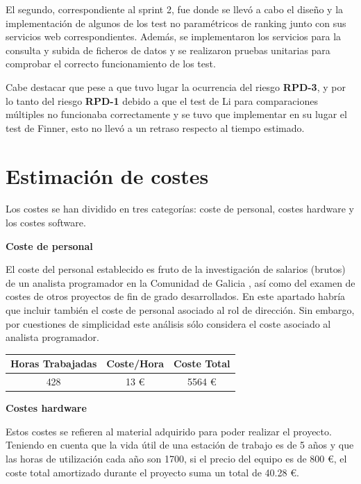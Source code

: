 El segundo, correspondiente al sprint 2, fue donde se llevó a cabo el diseño y la implementación de algunos de los test no paramétricos de ranking junto con sus servicios web correspondientes. Además, se implementaron los servicios para la consulta y subida de ficheros de datos y se realizaron pruebas unitarias para comprobar el correcto funcionamiento de los test.

Cabe destacar que pese a que tuvo lugar la ocurrencia del riesgo \textbf{RPD-3}, y por lo tanto del riesgo \textbf{RPD-1} debido a que el test de Li para comparaciones múltiples no funcionaba correctamente y se tuvo que implementar en su lugar el test de Finner, esto no llevó a un retraso respecto al tiempo estimado.

\section{Estimación de costes}

Los costes se han dividido en tres categorías: coste de personal, costes hardware y los costes software.

\noindent
\textbf{Coste de personal}

El coste del personal establecido es fruto de la investigación de salarios (brutos) de un analista programador en la Comunidad de Galicia \cite{payscale}, así como del examen de costes de otros proyectos de fin de grado desarrollados. En este apartado habría que incluir también el coste de personal asociado al rol de dirección. Sin embargo, por cuestiones de simplicidad este análisis sólo considera el coste asociado al analista programador.

\begin{table}[H]
	\centering
	\begin{tabular}{|c|c|c|}
		\hline
		\textbf{Horas Trabajadas} & \textbf{Coste/Hora} & \textbf{Coste Total} \\ \hline
		428 & 13 \euro & 5564 \euro \\ \hline
	\end{tabular}
\end{table}

\noindent
\textbf{Costes hardware}

Estos costes se refieren al material adquirido para poder realizar el proyecto. Teniendo en cuenta que la vida útil de una estación de trabajo es de 5 años y que las horas de utilización cada año son 1700, si el precio del equipo es de 800 \euro, el coste total amortizado durante el proyecto suma un total de 40.28 \euro.

